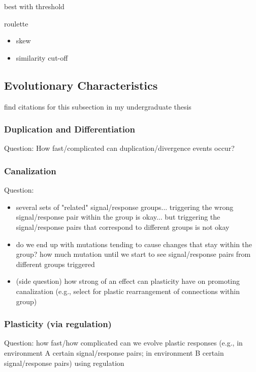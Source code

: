 best with threshold \citep{lalejini2019else}

roulette
\begin{itemize}
\item skew
\item similarity cut-off
\end{itemize}

\subsection{Evolutionary Characteristics}

find citations for this subsection in my undergraduate thesis

\subsubsection{Duplication and Differentiation}

Question: How fast/complicated can duplication/divergence events occur?

\subsubsection{Canalization}

Question:
\begin{itemize}
\item several sets of "related" signal/response groups... triggering the wrong signal/response pair within the group is okay... but triggering the signal/response pairs that correspond to different groups is not okay
\item do we end up with mutations tending to cause changes that stay within the group? how much mutation until we start to see signal/response pairs from different groups triggered
\item (side question) how strong of an effect can plasticity have on promoting canalization (e.g., select for plastic rearrangement of connections within group)
\end{itemize}

\subsubsection{Plasticity (via regulation)}

Question: how fast/how complicated can we evolve plastic responses (e.g., in environment A certain signal/response pairs; in environment B certain signal/response pairs) using regulation

